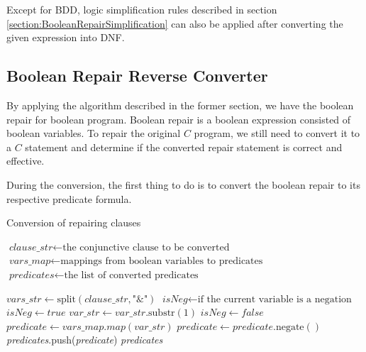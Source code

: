 Except for BDD, logic simplification rules described in section \ref{section:BooleanRepairSimplification} can also be applied after converting the given expression into DNF.

\subsection{Boolean Repair Reverse Converter}
By applying the algorithm described in the former section, we have the boolean repair for boolean program.
Boolean repair is a boolean expression consisted of boolean variables.
To repair the original $C$ program, we still need to convert it to a $C$ statement and determine if the converted repair statement is correct and effective.


During the conversion, the first thing to do is to convert the boolean repair to its respective predicate formula.

\begin{algorithm}
\caption{Conversion of repairing clauses}
\begin{algorithmic}[1]

\STATE $\textit{clause\_str} \gets \text{the conjunctive clause to be converted}$
\STATE $\textit{vars\_map} \gets \text{mappings from boolean variables to predicates}$
\STATE $\textit{predicates} \gets \text{the list of converted predicates}$
\STATE

\STATE $\textit{vars\_str} \gets \text{split}(\textit{clause\_str}, \text{"\&"})$
  \STATE $\textit{isNeg} \gets \text{if the current variable is a negation}$
    \STATE $\textit{isNeg} \gets true$
    \STATE $\textit{var\_str} \gets \textit{var\_str}.\text{substr}(1)$
  \ELSE
    \STATE $\textit{isNeg} \gets false$
  \ENDIF
  \STATE
  \STATE $\textit{predicate} \gets \textit{vars\_map}.map(\textit{var\_str})$
    \STATE $\textit{predicate} \gets \textit{predicate}.\text{negate}()$
  \ENDIF
  \STATE \textit{predicates}.push(\textit{predicate})
\ENDFOR
\STATE
\RETURN \textit{predicates}

\end{algorithmic}
\end{algorithm}

